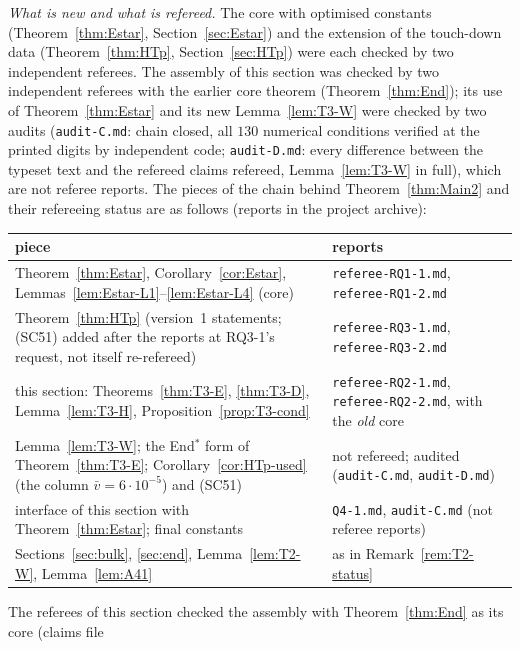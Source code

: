 \begin{remark}\label{rem:T3-status}
\emph{What is new and what is refereed.} The core with optimised constants (Theorem~\ref{thm:Estar}, Section~\ref{sec:Estar}) and the
extension of the touch-down data (Theorem~\ref{thm:HTp}, Section~\ref{sec:HTp}) were each checked by two independent referees. The
assembly of this section was checked by two independent referees with the earlier core theorem (Theorem~\ref{thm:End}); its use of
Theorem~\ref{thm:Estar} and its new Lemma~\ref{lem:T3-W} were checked by two audits (\texttt{audit-C.md}: chain closed, all $130$
numerical conditions verified at the printed digits by independent code; \texttt{audit-D.md}: every difference between the typeset
text and the refereed claims refereed, Lemma~\ref{lem:T3-W} in full), which are not referee reports. The pieces of the chain behind
Theorem~\ref{thm:Main2} and their refereeing status are as follows (reports in the project archive):
\begin{center}\small
\begin{tabular}{@{}p{}p{}@{}}
\toprule
piece & reports\\
\midrule
Theorem~\ref{thm:Estar}, Corollary~\ref{cor:Estar}, Lemmas~\ref{lem:Estar-L1}--\ref{lem:Estar-L4} (core) & \texttt{referee-RQ1-1.md}, \texttt{referee-RQ1-2.md}\\
Theorem~\ref{thm:HTp} (version~1 statements; (SC51) added after the reports at RQ3-1's request, not itself re-refereed) & \texttt{referee-RQ3-1.md}, \texttt{referee-RQ3-2.md}\\
this section: Theorems~\ref{thm:T3-E}, \ref{thm:T3-D}, Lemma~\ref{lem:T3-H}, Proposition~\ref{prop:T3-cond} & \texttt{referee-RQ2-1.md}, \texttt{referee-RQ2-2.md}, with the \emph{old} core\\
Lemma~\ref{lem:T3-W}; the End$^*$ form of Theorem~\ref{thm:T3-E}; Corollary~\ref{cor:HTp-used} (the column $\bar v=6\cdot10^{-5}$) and (SC51) & not refereed; audited (\texttt{audit-C.md}, \texttt{audit-D.md})\\
interface of this section with Theorem~\ref{thm:Estar}; final constants & \texttt{Q4-1.md}, \texttt{audit-C.md} (not referee reports)\\
Sections~\ref{sec:bulk}, \ref{sec:end}, Lemma~\ref{lem:T2-W}, Lemma~\ref{lem:A41} & as in Remark~\ref{rem:T2-status}\\
\bottomrule
\end{tabular}
\end{center}
The referees of this section checked the assembly with Theorem~\ref{thm:End} as its core (claims file

\end{remark}
